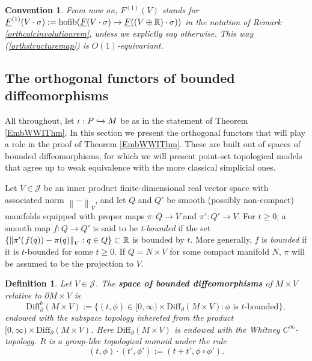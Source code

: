 \documentclass[a4paper, oneside]{amsart}
\newcommand{\diff}{\mathrm{Diff}}
\newcommand{\hofib}{\operatorname{hofib}}
\newcommand{\1}{\mathds{1}}
\newtheorem{conv}[thm]{Convention}
\newtheorem{defn}[thm]{Definition}
\theoremstyle{remark}
\theoremstyle{definition}
\newcommand{\norm}[1]{\left\lVert #1 \right\rVert }
\newcommand{\R}{{\scaleobj{0.97}{\mathbb{R}}}}
\numberwithin{equation}{section}
\begin{document}
\begin{conv}
    From now on, $F^{(1)}(V)$ stands for $\underline{F}^{(1)}(V\cdot\sigma):=\hofib(\underline{F}(V\cdot\sigma)\to \underline{F}((V\oplus\R)\cdot\sigma))$ in the notation of Remark \ref{orthcalcinvolutionrem}, unless we explictly say otherwise. This way (\ref{orthstructuremap}) is $O(1)$-equivariant.
\end{conv}






\subsection{The orthogonal functors of bounded diffeomorphisms}\label{boundedsection}

All throughout, let $\iota:P\xhookrightarrow{}M$ be as in the statement of Theorem \ref{EmbWWIThm}. In this section we present the orthogonal functors that will play a role in the proof of Theorem \ref{EmbWWIThm}. These are built out of spaces of bounded diffeomorphisms, for which we will present point-set topological models that agree up to weak equivalence with the more classical simplicial ones. 


Let $V\in \mathcal J$ be an inner product finite-dimensional real vector space with associated norm $\norm{-}_V$, and let $Q$ and $Q'$ be smooth (possibly non-compact) manifolds equipped with proper maps $\pi: Q\to V$ and $\pi': Q'\to V$. For $t\geq 0$, a smooth map $f: Q\to Q'$ is said to be \textit{t-bounded} if the set $
\{\norm{\pi'(\hspace{1pt}f(q))-\pi(q)}_V: q\in Q\}\subset \R$ is bounded by $t$. More generally, $f$ is \textit{bounded} if it is $t$-bounded for some $t\geq 0$. If $Q=N\times V$ for some compact manifold $N$, $\pi$ will be assumed to be the projection to $V$.





\begin{defn}\label{topboundeddefn}
    Let $V\in \mathcal J$. The \textbf{space of bounded diffeomorphisms} of $M\times V$ relative to $\partial M\times V$ is 
    $$
\diff^b_\partial(M\times V):=\{(t,\phi)\in [0,\infty)\times \diff_\partial(M\times V): \text{$\phi$ is $t$-bounded}\},
    $$
    endowed with the subspace topology inhereted from the product $[0,\infty)\times \diff_\partial(M\times V)$. Here $\diff_\partial(M\times V)$ is endowed with the Whitney $C^\infty$-topology. It is a group-like topological monoid under the rule $$(t,\phi)\cdot(t',\phi'):=(t+t',\phi\circ\phi').$$
\end{defn}
\end{document}
